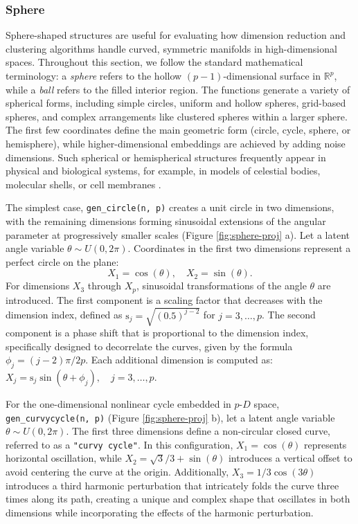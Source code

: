 \subsubsection{Sphere}\label{sphere}

Sphere-shaped structures are useful for evaluating how dimension reduction and clustering algorithms handle curved, symmetric manifolds in high-dimensional spaces. Throughout this section, we follow the standard mathematical terminology: a \emph{sphere} refers to the hollow \((p-1)\)-dimensional surface in \(\mathbb{R}^p\), while a \emph{ball} refers to the filled interior region. The functions generate a variety of spherical forms, including simple circles, uniform and hollow spheres, grid-based spheres, and complex arrangements like clustered spheres within a larger sphere. The first few coordinates define the main geometric form (circle, cycle, sphere, or hemisphere), while higher-dimensional embeddings are achieved by adding noise dimensions. Such spherical or hemispherical structures frequently appear in physical and biological systems, for example, in models of celestial bodies, molecular shells, or cell membranes \citep{tinkham2003, alberts2014}.

The simplest case, \texttt{gen\_circle(n,\ p)} creates a unit circle in two dimensions, with the remaining dimensions forming sinusoidal extensions of the angular parameter at progressively smaller scales (Figure \ref{fig:sphere-proj} a). Let a latent angle variable \(\theta \sim U(0, 2\pi)\). Coordinates in the first two dimensions represent a perfect circle on the plane: \[X_1 = \cos(\theta), \quad X_2 = \sin(\theta).\] For dimensions \(X_3\) through \(X_p\), sinusoidal transformations of the angle \(\theta\) are introduced. The first component is a scaling factor that decreases with the dimension index, defined as \(\text{s}_j = \sqrt{(0.5)^{j-2}}\) for \(j = 3, \dots, p\). The second component is a phase shift that is proportional to the dimension index, specifically designed to decorrelate the curves, given by the formula \(\phi_j = (j - 2)\pi/2p\). Each additional dimension is computed as: \(X_j = \text{s}_{j}\sin(\theta + \phi_j), \quad j = 3, \dots, p\).

For the one-dimensional nonlinear cycle embedded in \(p\text{-}D\) space, \texttt{gen\_curvycycle(n,\ p)} (Figure \ref{fig:sphere-proj} b), let a latent angle variable \(\theta \sim U(0, 2\pi)\). The first three dimensions define a non-circular closed curve, referred to as a \texttt{"curvy\ cycle"}. In this configuration, \(X_1 = \cos(\theta)\) represents horizontal oscillation, while \(X_2 = \sqrt{3}/3 + \sin(\theta)\) introduces a vertical offset to avoid centering the curve at the origin. Additionally, \(X_3 = 1/3\cos(3\theta)\) introduces a third harmonic perturbation that intricately folds the curve three times along its path, creating a unique and complex shape that oscillates in both dimensions while incorporating the effects of the harmonic perturbation.

